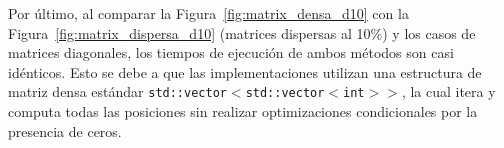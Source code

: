 Por último, al comparar la Figura~\ref{fig:matrix_densa_d10} con la Figura~\ref{fig:matrix_dispersa_d10} (matrices dispersas al 10\%) y los casos de matrices diagonales, los tiempos de ejecución de ambos métodos son casi idénticos. Esto se debe a que las implementaciones utilizan una estructura de matriz densa estándar \texttt{std::vector$<$std::vector$<$int$>>$}, la cual itera y computa todas las posiciones sin realizar optimizaciones condicionales por la presencia de ceros.